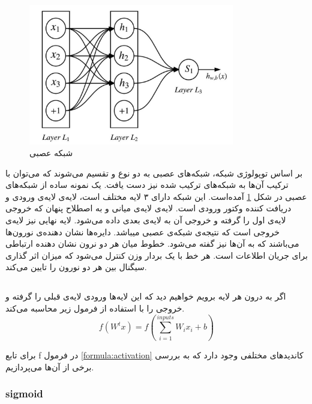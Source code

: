 \documentclass[12pt, a4paper, oneside]{report}
\begin{document}
\begin{figure}[h]
    \centering
    \includegraphics[width=0.80\textwidth]{FFNN}
    \caption{شبکه عصبی }
    \label{fig:ffnn}
\end{figure}

بر اساس توپولوژی شبکه، شبکه‌های عصبی به دو نوع 
و
تقسیم می‌شوند که می‌توان با ترکیب آن‌ها به شبکه‌های ترکیب شده نیز دست یافت.
یک نمونه ساده از شبکه‌های عصبی
در شکل
\ref{fig:ffnn}
آمده‌است. این شبکه دارای ۳ لایه مختلف است، لایه‌ی
لایه‌ی ورودی و دریافت کننده وکتور ورودی است. لایه‌ی
لایه‌ی میانی و به اصطلاح پنهان که خروجی لایه‌ی اول را گرفته و خروجی آن به لایه‌ی بعدی داده می‌شود. لایه نهایی نیز لایه‌ی
خروجی است که نتیجه‌ی شبکه‌ی عصبی میباشد.
دایره‌ها نشان دهنده‌ی نورون‌ها می‌باشند که به آن‌ها
نیز گفته می‌شود. خطوط میان هر دو نرون نشان دهنده ارتباطی برای جریان اطلاعات است. هر خط با یک بردار وزن کنترل می‌شود
که میزان اثر گذاری سیگنال بین هر دو نورون را تایین می‌کند.

\subsection{}

اگر به درون هر لایه برویم خواهیم دید که این لایه‌ها ورودی لایه‌ی قبلی را گرفته و خروجی را با استفاده از فرمول زیر
محاسبه می‌کند.
\begin{equation}
    f(W^tx)=f(\sum_{i=1}^{inputs} W_ix_i + b)
    \label{formula:activation}
\end{equation}

برای تابع
f
در فرمول
\ref{formula:activation}
کاندیدهای مختلفی وجود دارد که به بررسی برخی از آن‌ها می‌پردازیم.

\subsubsection{sigmoid}
\end{document}
